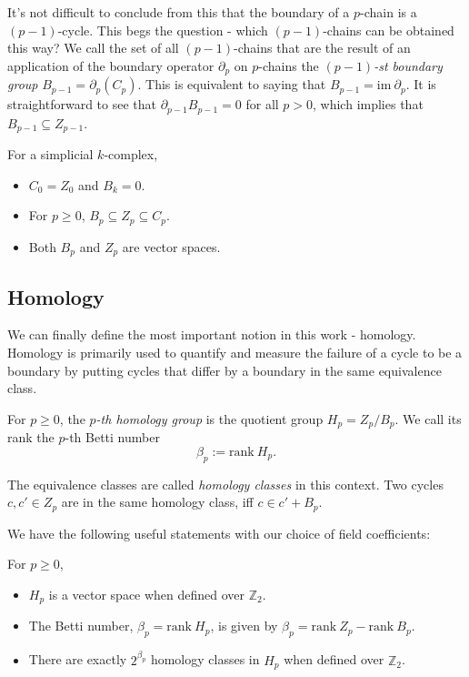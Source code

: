 It's not difficult to conclude from this that the boundary of a $p$-chain is a $(p-1)$-cycle. This begs the question - which $(p-1)$-chains can be obtained this way? We call the set of all $(p-1)$-chains that are the result of an application of the boundary operator $\partial_{p}$ on $p$-chains the \textit{$(p-1)$-st boundary group} $B_{p-1} = \partial_{p}(C_{p})$. This is equivalent to saying that $B_{p-1} = \text{im} \: \partial_{p}$. It is straightforward to see that $\partial_{p-1}B_{p-1} = 0$ for all $p>0$, which implies that $B_{p-1} \subseteq Z_{p-1}$.

\begin{theorem}
  For a simplicial $k$-complex,
  \begin{itemize}
    \item $C_{0} = Z_{0}$ and $B_{k} = 0$.
    \item For $p \geq 0$, $B_{p} \subseteq Z_{p} \subseteq C_{p}$.
    \item Both $B_{p}$ and $Z_{p}$ are vector spaces.
  \end{itemize}
\end{theorem}

\subsection{Homology}
We can finally define the most important notion in this work - homology. Homology is primarily used to quantify and measure the failure of a cycle to be a boundary by putting cycles that differ by a boundary in the same equivalence class.

\begin{definition}
  For $p \geq 0$, the \textit{$p$-th homology group} is the quotient group $H_{p} = Z_{p} / B_{p}$. We call its rank the $p$-th Betti number
  \begin{equation*}
    \beta_{p} := \text{rank} \: H_{p}.
  \end{equation*}
\end{definition}

The equivalence classes are called \textit{homology classes} in this context. Two cycles $c, c' \in Z_{p}$ are in the same homology class, iff $c \in c' + B_{p}$.

We have the following useful statements with our choice of field coefficients:

\begin{theorem}
  For $p \geq 0$,
  \begin{itemize}
    \item $H_{p}$ is a vector space when defined over $\mathbb{Z}_{2}$.
    \item The Betti number, $\beta_{p} = \text{rank}\:H_{p}$, is given by $\beta_{p} = \text{rank}\:Z_{p} - \text{rank}\:B_{p}$.
    \item There are exactly $2^{\beta_{p}}$ homology classes in $H_{p}$ when defined over $\mathbb{Z}_{2}$.
  \end{itemize}
\end{theorem}

